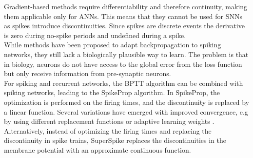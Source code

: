 Gradient-based methods require differentiability and therefore continuity, making them applicable only for \acp{ANN}. This means that they cannot be used for \acp{SNN} as spikes introduce discontinuities. Since spikes are discrete events the derivative is zero during no-spike periods and undefined during a spike.\\
While methods have been proposed to adapt backpropagation to spiking networks\cite{lee_training_2016}, they still lack a biologically plausible way to learn. The problem is that in biology, neurons do not have access to the global error from the loss function but only receive information from pre-synaptic neurons.\\
For spiking and recurrent networks, the \ac{BPTT} algorithm can be combined with spiking networks, leading to the SpikeProp\cite{bohte_spikeprop_2000} algorithm. In SpikeProp, the optimization is performed on the firing times, and the discontinuity is replaced by a linear function. Several variations have emerged with improved convergence\cite{mckennoch_fast_2006}, e.g by using different replacement functions \cite{thiruvarudchelvan_analysis_2013,neftci_surrogate_2019} or adaptive learning weights \cite{shrestha_adaptive_2015}.
Alternatively, instead of optimizing the firing times and replacing the discontinuity in spike trains, SuperSpike\cite{zenke_superspike_2018} replaces the discontinuities in the membrane potential with an approximate continuous function.\\
